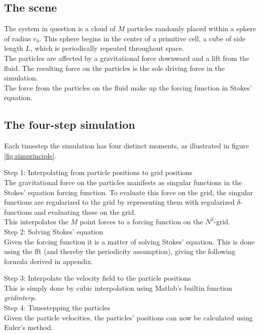 \documentclass[a4paper,twoside=false,abstract=false,numbers=noenddot,
titlepage=false,headings=small,parskip=half,version=last]{scrartcl}
\begin{document}
\subsection{The scene}
The system in question is a cloud of $M$ particles randomly placed within a sphere of radius $r_0$. This sphere begins in the center of a primitive cell, a cube of side length $L$, which is periodically repeated throughout space.\\
The particles are affected by a gravitational force downward and a lift from the fluid. The resulting force on the particles is the sole driving force in the simulation.\\
The force from the particles on the fluid make up the forcing function in Stokes' equation.
\subsection{The four-step simulation}

Each timestep the simulation has four distinct moments, as illustrated in figure \ref{fig:simprinciple}.

Step 1: Interpolating from particle positions to grid positions\\
The gravitational force on the particles manifests as singular functions in the Stokes' equation forcing function. To evaluate this force on the grid, the singular functions are regularized to the grid by representing them with regularized $\delta$-functions and evaluating these on the grid.\\ This interpolates the $M$ point forces to a forcing function on the $N^3$-grid.\\
Step 2: Solving Stokes' equation\\
Given the forcing function it is a matter of solving Stokes' equation. This is done using the fft (and thereby the periodicity assumption), giving the following formula derived in appendix.

Step 3: Interpolate the velocity field to the particle positions\\
This is simply done by cubic interpolation using Matlab's builtin function \emph{gridinterp}.\\
Step 4: Timestepping the particles\\
Given the particle velocities, the particles' positions can now be calculated using Euler's method.\\
\end{document}
